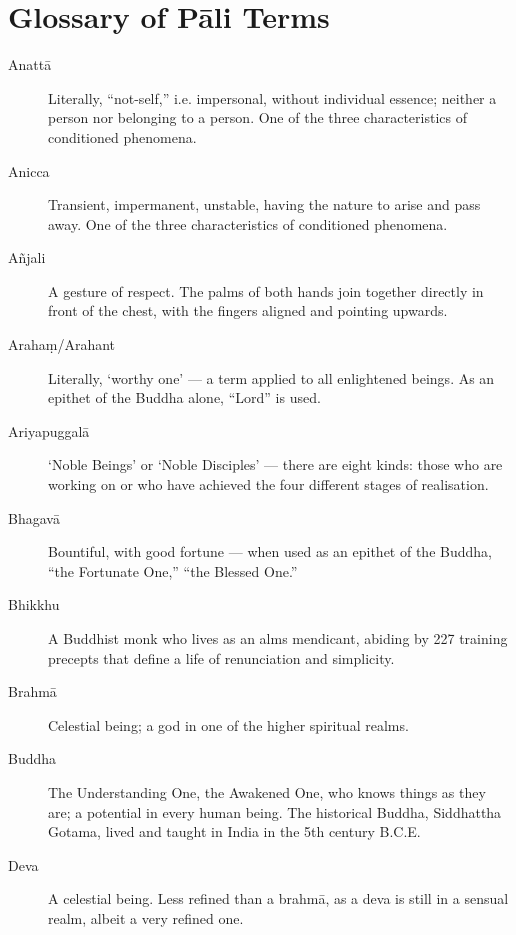 \chapter{Glossary of Pāli Terms}

\begin{description}

\item[Anattā] Literally, “not-self,” i.e. impersonal, without individual
  essence; neither a person nor belonging to a person. One of the three
  characteristics of conditioned phenomena.

\item[Anicca] Transient, impermanent, unstable, having the nature to
  arise and pass away. One of the three characteristics of conditioned
  phenomena.

\item[Añjali] A gesture of respect. The palms of both hands join
  together directly in front of the chest, with the fingers aligned and
  pointing upwards.

\item[Arahaṃ/Arahant] Literally, ‘worthy one’ --- a term applied to all
  enlightened beings. As an epithet of the Buddha alone, “Lord” is used.

\item[Ariyapuggalā] ‘Noble Beings’ or ‘Noble Disciples’ --- there are
  eight kinds: those who are working on or who have achieved the four
  different stages of realisation.

\item[Bhagavā] Bountiful, with good fortune --- when used as an epithet of
  the Buddha, “the Fortunate One,” “the Blessed One.”

\item[Bhikkhu] A Buddhist monk who lives as an alms mendicant, abiding
  by 227 training precepts that define a life of renunciation and
  simplicity.

\item[Brahmā] Celestial being; a god in one of the higher spiritual
  realms.

\item[Buddha] The Understanding One, the Awakened One, who knows things
  as they are; a potential in every human being. The historical Buddha,
  Siddhattha Gotama, lived and taught in India in the 5th century B.C.E.

\item[Deva] A celestial being. Less refined than a brahmā, as a deva is
  still in a sensual realm, albeit a very refined one.


\end{description}
